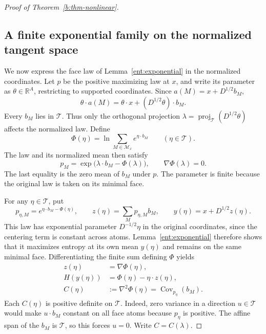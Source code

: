 \begin{proof}[Proof of Theorem~\ref{b:thm-nonlinear}]
\subsection{A finite exponential family on the normalized tangent space}
\label{b:exponential-family}

We now express the face law of Lemma~\ref{ent:exponential} in the
normalized coordinates. Let \(p\) be the positive maximizing law at
\(x\), and write its parameter as \(\theta\in\mathbb R^A\),
restricting to supported coordinates. Since
\(a(M)=x+D^{1/2}b_M\),
\[
 \theta\cdot a(M)=\theta\cdot x+
                      (D^{1/2}\theta)\cdot b_M.
\]
Every \(b_M\) lies in \(\mathcal T\). Thus only the orthogonal
projection \(\lambda=\operatorname{proj}_{\mathcal T}
(D^{1/2}\theta)\) affects the normalized law. Define
\[
 \Phi(\eta)=\ln\sum_{M\in\mathcal M_x}e^{\eta\cdot b_M}
 \qquad(\eta\in\mathcal T).
\]
The law and its normalized mean then satisfy
\begin{equation}
 p_M=\exp\bigl(\lambda\cdot b_M-\Phi(\lambda)\bigr),
 \qquad \nabla\Phi(\lambda)=0.
 \label{b:eq-exponential-law}
\end{equation}
The last equality is the zero mean of \(b_M\) under \(p\).
The parameter is finite because the original law is taken on its
minimal face.

For any \(\eta\in\mathcal T\), put
\[
 p_{\eta,M}=e^{\eta\cdot b_M-\Phi(\eta)},\qquad
 z(\eta)=\sum_Mp_{\eta,M}b_M,\qquad
 y(\eta)=x+D^{1/2}z(\eta).
\]
This law has exponential parameter \(D^{-1/2}\eta\) in the
original coordinates, since the centering term is constant across
atoms. Lemma~\ref{ent:exponential} therefore shows that it maximizes
entropy at its own mean \(y(\eta)\) and remains on the same minimal
face. Differentiating the finite sum defining \(\Phi\) yields
\begin{equation}
 \begin{aligned}
 z(\eta)&=\nabla\Phi(\eta),\\
 H(y(\eta))&=\Phi(\eta)-\eta\cdot z(\eta),\\
 C(\eta)&:=\nabla^2\Phi(\eta)
       =\operatorname{Cov}_{p_\eta}(b_M).
 \end{aligned}
 \label{b:eq-mean-entropy-covariance}
\end{equation}
Each \(C(\eta)\) is positive definite on \(\mathcal T\).
Indeed, zero variance in a direction \(u\in\mathcal T\) would make
\(u\cdot b_M\) constant on all face atoms because \(p_\eta\) is
positive.  The affine span of the \(b_M\) is \(\mathcal T\), so
this forces \(u=0\).  Write \(C=C(\lambda)\).


\end{proof}
